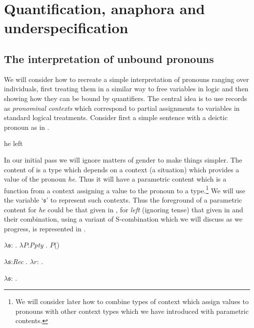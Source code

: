 \chapter{Quantification, anaphora and underspecification}
\label{ch:quant}
\setcounter{equation}{0}

\section{The interpretation of unbound pronouns}
We will consider how to recreate a simple interpretation of pronouns
ranging over individuals, first treating them in a similar way to free
variables in logic and then showing how they can be bound by
quantifiers.  The central idea is to use records as \textit{pronominal
  contexts} which correspond to partial assignments to variables in
standard logical treatments.  Consider first a simple sentence with a deictic
pronoun as in \nexteg{}.
\begin{ex} 
he left 
\end{ex} 
In our initial pass we will ignore matters
of gender to make things simpler.  The content of \preveg{} is a type
which depends on a context (a situation) which provides a value of the
pronoun \textit{he}. Thus it will have a parametric content which is a
function from a context assigning a value to the pronoun to a
type.\footnote{We will consider later how to combine types of context
  which assign values to pronouns with other context types which we
  have introduced with parametric contents.}  We will use the variable
`$\mathfrak{s}$' to represent such contexts.  Thus the foreground of a parametric content for
\textit{he} could be that given in , for \textit{left}
(ignoring tense) that given in  and their combination, using a variant
of S-combination which we will discuss as we progress, is represented
in .
\begin{ex} 
\begin{subex} 
 
\item $\lambda\mathfrak{s}$: . 
        $\lambda P$:\textit{Ppty} . $P$()
 
\item $\lambda\mathfrak{s}$:\textit{Rec} . 
        $\lambda r$: . 

\item $\lambda\mathfrak{s}$:
  . 
 
\end{subex} 
   
\end{ex}
